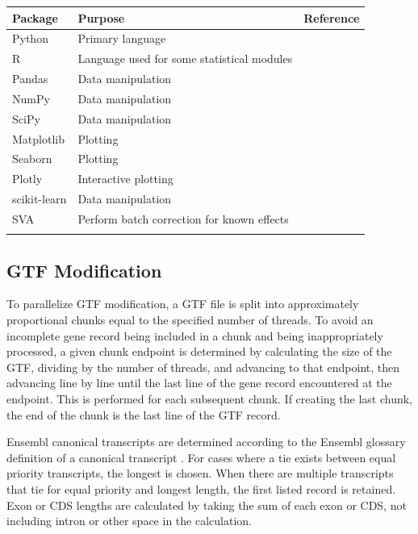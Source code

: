 \documentclass[10pt, oneside]{article}
\begin{document}
\begin{table}[!]
    \centering
{}
\begin{tabular}{p{2.4cm}p{7.5cm}p{3cm}}
 \textbf{Package} & \textbf{Purpose} & \textbf{Reference} \\
 \hline
 Python & Primary language & \\
 \hline
 R & Language used for some statistical modules & \\
 \hline
 Pandas & Data manipulation & \cite{pandas} \\
 \hline
 NumPy & Data manipulation & \cite{numpy1, numpy2} \\
 \hline
 SciPy & Data manipulation & \cite{scipy} \\
 \hline
 Matplotlib & Plotting & \cite{matplotlib} \\
 \hline
 Seaborn & Plotting & \cite{seaborn} \\
 \hline
 Plotly & Interactive plotting & \cite{plotly} \\
 \hline
 scikit-learn & Data manipulation & \cite{sklearn} \\
 \hline
 SVA & Perform batch correction for known effects & \cite{sva} \\
 \label{Tab:software_plot}
 \end{tabular}
\end{table}

\subsection{GTF Modification}
To parallelize GTF modification, a GTF file is split into approximately proportional chunks equal to the specified number of threads. To avoid an incomplete gene record being included in a chunk and being inappropriately processed, a given chunk endpoint is determined by calculating the size of the GTF, dividing by the number of threads, and advancing to that endpoint, then advancing line by line until the last line of the gene record encountered at the endpoint. This is performed for each subsequent chunk. If creating the last chunk, the end of the chunk is the last line of the GTF record. \par

Ensembl canonical transcripts are determined according to the Ensembl glossary definition of a canonical transcript \cite{ensembl_canon}. For cases where a tie exists between equal priority transcripts, the longest is chosen. When there are multiple transcripts that tie for equal priority and longest length, the first listed record is retained. Exon or CDS lengths are calculated by taking the sum of each exon or CDS, not including intron or other space in the calculation. \par
\end{document}
